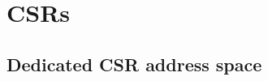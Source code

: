 \documentclass[10pt,titlepage,twoside]{book}
\begin{document}






\clearpage
\chapter{\acfp{CSR}}
\minitoc
\newpage

\section{Dedicated CSR address space}
\end{document}
